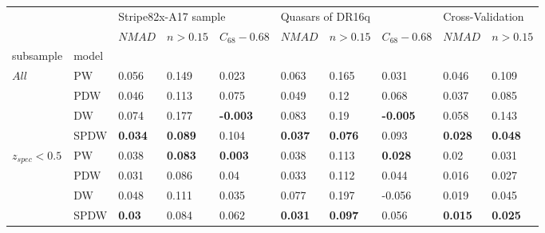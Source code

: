 \documentclass[fleqn,usenatbib]{mnras}
\begin{document}
\begin{table}
	\begin{tabular}{llllllllll}
            \hline
                              &      & \multicolumn{3}{l}{Stripe82x-A17 sample} & \multicolumn{3}{l}{Quasars of DR16q} & \multicolumn{2}{l}{Cross-Validation} \\
                              &      &               $NMAD$ &        $n>0.15$ &  $C_{68} - 0.68$ &           $NMAD$ &        $n>0.15$ &  $C_{68} - 0.68$ &           $NMAD$ &        $n>0.15$ \\
            subsample & model &                      &                 &                  &                  &                 &                  &                  &                 \\
            \hline
\hline
            $All$ & PW &                0.056 &           0.149 &            0.023 &            0.063 &           0.165 &            0.031 &            0.046 &           0.109 \\
                              & PDW &                0.046 &           0.113 &            0.075 &            0.049 &            0.12 &            0.068 &            0.037 &           0.085 \\
                              & DW &                0.074 &           0.177 &  \textbf{-0.003} &            0.083 &            0.19 &  \textbf{-0.005} &            0.058 &           0.143 \\
                              & SPDW &       \textbf{0.034} &  \textbf{0.089} &            0.104 &   \textbf{0.037} &  \textbf{0.076} &            0.093 &   \textbf{0.028} &  \textbf{0.048} \\
\hline
            $z_{spec} < 0.5$ & PW &                0.038 &  \textbf{0.083} &   \textbf{0.003} &            0.038 &           0.113 &   \textbf{0.028} &             0.02 &           0.031 \\
                              & PDW &                0.031 &           0.086 &             0.04 &            0.033 &           0.112 &            0.044 &            0.016 &           0.027 \\
                              & DW &                0.048 &           0.111 &            0.035 &            0.077 &           0.197 &           -0.056 &            0.019 &           0.045 \\
                              & SPDW &        \textbf{0.03} &           0.084 &            0.062 &   \textbf{0.031} &  \textbf{0.097} &            0.056 &   \textbf{0.015} &  \textbf{0.025} \\

\end{tabular}
\end{table}
\end{document}
